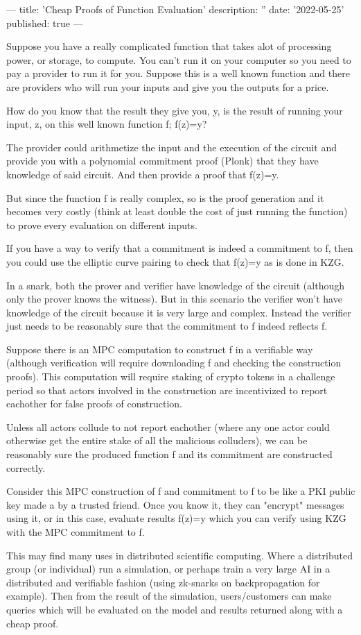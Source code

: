 ---
title: 'Cheap Proofs of Function Evaluation'
description: ''
date: '2022-05-25'
published: true
---

Suppose you have a really complicated function that takes alot of processing
power, or storage, to compute. You can't run it on your computer so you
need to pay a provider to run it for you. Suppose this is a well known function
and there are providers who will run your inputs and give you the outputs for a
price.

How do you know that the result they give you, y, is the result of running your
input, z, on this well known function f; f(z)=y?

The provider could arithmetize the input and the execution of the circuit and
provide you with a polynomial commitment proof (Plonk) that they have knowledge
of said circuit. And then provide a proof that f(z)=y.

But since the function f is really complex, so is the proof generation and it
becomes very costly (think at least double the cost of just running the
function) to prove every evaluation on different inputs.

If you have a way to verify that a commitment is indeed a commitment to f, then
you could use the elliptic curve pairing to check that f(z)=y as is done in
KZG.

In a snark, both the prover and verifier have knowledge of the circuit
(although only the prover knows the witness). But in this scenario the verifier
won't have knowledge of the circuit because it is very large and complex.
Instead the verifier just needs to be reasonably sure that the commitment to f
indeed reflects f.

Suppose there is an MPC computation to construct f in a verifiable way
(although verification will require downloading f and checking the construction
proofs). This computation will require staking of crypto tokens in a challenge
period so that actors involved in the construction are incentivized to report
eachother for false proofs of construction.

Unless all actors collude to not report eachother (where any one actor could
otherwise get the entire stake of all the malicious colluders), we can be
reasonably sure the produced function f and its commitment are constructed correctly.

Consider this MPC construction of f and commitment to f to be like a PKI public
key made a by a trusted friend. Once you know it, they can "encrypt" messages
using it, or in this case, evaluate results f(z)=y which you can verify using
KZG with the MPC commitment to f.

This may find many uses in distributed scientific computing. Where a
distributed group (or individual) run a simulation, or perhaps train a very large AI in a
distributed and verifiable fashion (using zk-snarks on backpropagation for
example). Then from the result of the simulation, users/customers can make
queries which will be evaluated on the model and results returned along with a
cheap proof.
